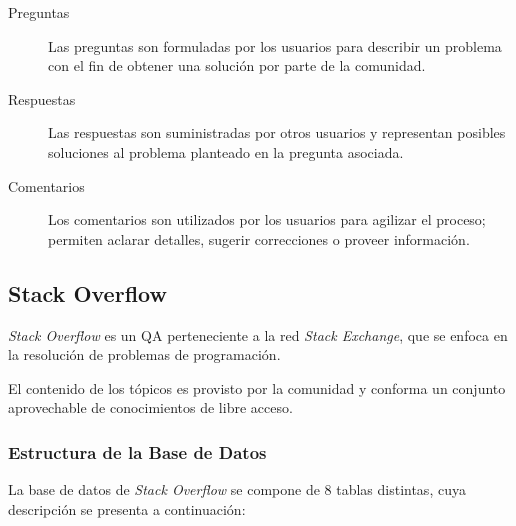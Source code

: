 \begin{description}
  \item [Preguntas] Las preguntas son formuladas por los usuarios para describir
  un problema con el fin de obtener una solución por parte de la comunidad.
  \item [Respuestas] Las respuestas son suministradas por otros usuarios y %
  representan posibles soluciones al problema planteado en la pregunta asociada.
  \item [Comentarios] Los comentarios son utilizados por los usuarios para agilizar el proceso; 
  permiten aclarar detalles, sugerir correcciones o proveer información.
\end{description}

\subsection{Stack Overflow}

\textit{Stack Overflow} es un \ac{QA} perteneciente a la red \textit{Stack Exchange},
que se enfoca en la resolución de problemas de programación.

El contenido de los tópicos es provisto por la comunidad y
conforma un conjunto aprovechable de conocimientos de libre acceso.

\subsubsection{Estructura de la Base de Datos}
\label{subsec:EstBasDat}

La base de datos de \textit{Stack Overflow} se compone de 8 tablas distintas,
cuya descripción se presenta a continuación:

